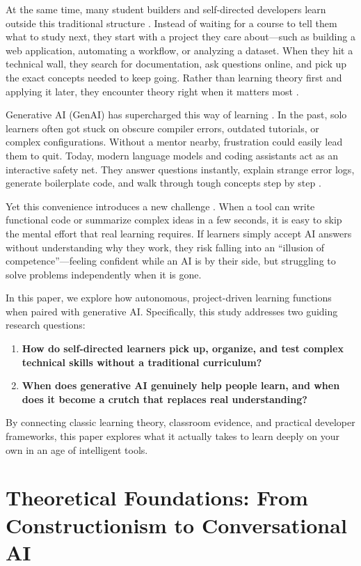\documentclass[11pt]{article}
\begin{document}
At the same time, many student builders and self-directed developers learn outside this traditional structure \citep{knowles1975,song2026heutagogy}. Instead of waiting for a course to tell them what to study next, they start with a project they care about---such as building a web application, automating a workflow, or analyzing a dataset. When they hit a technical wall, they search for documentation, ask questions online, and pick up the exact concepts needed to keep going. Rather than learning theory first and applying it later, they encounter theory right when it matters most \citep{resnick2017}.

Generative AI (GenAI) has supercharged this way of learning \citep{kumar2024,zheng2024}. In the past, solo learners often got stuck on obscure compiler errors, outdated tutorials, or complex configurations. Without a mentor nearby, frustration could easily lead them to quit. Today, modern language models and coding assistants act as an interactive safety net. They answer questions instantly, explain strange error logs, generate boilerplate code, and walk through tough concepts step by step \citep{emergentagents2026}.

Yet this convenience introduces a new challenge \citep{sweller1988}. When a tool can write functional code or summarize complex ideas in a few seconds, it is easy to skip the mental effort that real learning requires. If learners simply accept AI answers without understanding why they work, they risk falling into an ``illusion of competence''---feeling confident while an AI is by their side, but struggling to solve problems independently when it is gone.

In this paper, we explore how autonomous, project-driven learning functions when paired with generative AI. Specifically, this study addresses two guiding research questions:
\begin{enumerate}
\item \textbf{How do self-directed learners pick up, organize, and test complex technical skills without a traditional curriculum?}
\item \textbf{When does generative AI genuinely help people learn, and when does it become a crutch that replaces real understanding?}
\end{enumerate}
By connecting classic learning theory, classroom evidence, and practical developer frameworks, this paper explores what it actually takes to learn deeply on your own in an age of intelligent tools.

\section{Theoretical Foundations: From Constructionism to Conversational AI}
\end{document}
